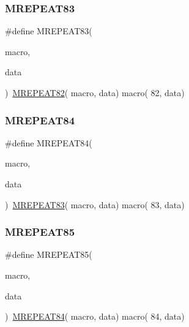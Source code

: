 \mbox{\label{group__group__sam0__utils__mrepeat_ga05a5bfb2999f879cbf95768b7cc98d8f}} 
\subsubsection{\texorpdfstring{MREPEAT83}{MREPEAT83}}
{\footnotesize\ttfamily \#define M\+R\+E\+P\+E\+A\+T83(\begin{DoxyParamCaption}\item[{}]{macro,  }\item[{}]{data }\end{DoxyParamCaption})~\mbox{\hyperlink{group__group__sam0__utils__mrepeat_gab614d1a44b41de1264618e26d1f457c6}{M\+R\+E\+P\+E\+A\+T82}}( macro, data)   macro( 82, data)}

\mbox{\label{group__group__sam0__utils__mrepeat_ga8892fab4572ce20132d8237a4fea0f3e}} 
\subsubsection{\texorpdfstring{MREPEAT84}{MREPEAT84}}
{\footnotesize\ttfamily \#define M\+R\+E\+P\+E\+A\+T84(\begin{DoxyParamCaption}\item[{}]{macro,  }\item[{}]{data }\end{DoxyParamCaption})~\mbox{\hyperlink{group__group__sam0__utils__mrepeat_ga05a5bfb2999f879cbf95768b7cc98d8f}{M\+R\+E\+P\+E\+A\+T83}}( macro, data)   macro( 83, data)}

\mbox{\label{group__group__sam0__utils__mrepeat_gac310966754e3b2f99d3bc542eabbcd32}} 
\subsubsection{\texorpdfstring{MREPEAT85}{MREPEAT85}}
{\footnotesize\ttfamily \#define M\+R\+E\+P\+E\+A\+T85(\begin{DoxyParamCaption}\item[{}]{macro,  }\item[{}]{data }\end{DoxyParamCaption})~\mbox{\hyperlink{group__group__sam0__utils__mrepeat_ga8892fab4572ce20132d8237a4fea0f3e}{M\+R\+E\+P\+E\+A\+T84}}( macro, data)   macro( 84, data)}

